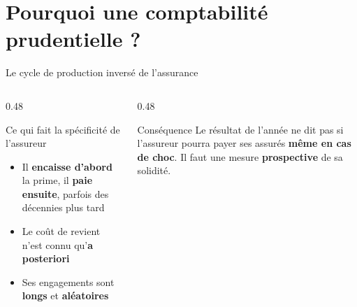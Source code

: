 \documentclass[10pt,aspectratio=169]{beamer}
\begin{document}
\section{Pourquoi une comptabilité prudentielle ?}

\begin{frame}{Le cycle de production inversé de l'assurance}
\begin{columns}[T]
\begin{column}{0.48\textwidth}
\begin{block}{Ce qui fait la spécificité de l'assureur}
\begin{itemize}
  \item Il \textbf{encaisse d'abord} la prime, il \textbf{paie ensuite}, parfois des décennies plus tard
  \item Le coût de revient n'est connu qu'\textbf{a posteriori}
  \item Ses engagements sont \textbf{longs} et \textbf{aléatoires}
\end{itemize}
\end{block}
\end{column}
\begin{column}{0.48\textwidth}
\begin{alertblock}{Conséquence}
Le résultat de l'année ne dit pas si l'assureur pourra payer ses assurés \textbf{même en cas de
choc}. Il faut une mesure \textbf{prospective} de sa solidité.
\end{alertblock}
\end{column}
\end{columns}
\vspace{0.4cm}
\begin{center}
\end{center}
\end{frame}
\end{document}
